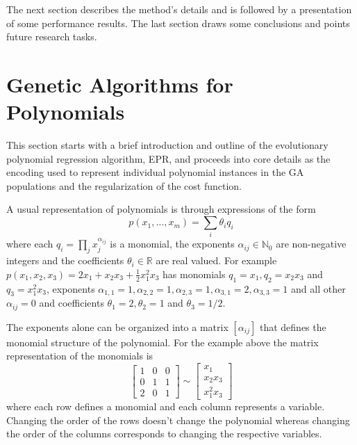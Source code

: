 \documentclass[review,preprint]{elsarticle}
\begin{document}
The next section describes the method's details and is followed by a presentation of some performance results. The last section draws some conclusions and points future research tasks.

\section{Genetic Algorithms for Polynomials}
This section starts with a brief introduction and outline of the evolutionary polynomial regression algorithm, \ac{EPR}, and proceeds into core details as the encoding used to represent individual polynomial instances in the \ac{GA} populations and the regularization of the cost function.

A usual representation of polynomials is through expressions of the form
$$
p\left( x_1, \ldots, x_m\right) = \sum_i \theta_i q_i
$$
where each $q_i = \prod_{j} x_j^{\alpha_{ij}}$ is a monomial, the exponents $\alpha_{ij}\in\mathbb{N}_0$ are non-negative integers and the coefficients $\theta_i \in \mathbb{R}$ are real valued. For example $p\left( x_1, x_2, x_3 \right) = 2 x_1 + x_2 x_3 + \frac{1}{2} x_1^2 x_3$ has monomials $q_1 = x_1, q_2 = x_2 x_3$ and $q_3 = x_1^2 x_3$, exponents $\alpha_{1,1} = 1, \alpha_{2,2}=1, \alpha_{2,3} = 1, \alpha_{3,1} = 2, \alpha_{3,3} = 1$ and all other $\alpha_{ij} = 0$ and coefficients $\theta_1 = 2, \theta_2 = 1$ and $\theta_3 = 1/2$.

The exponents alone can be organized into a matrix $\left[\alpha_{ij}\right]$ that defines the monomial structure of the polynomial. For the example above the matrix representation of the monomials is
$$
\left[ 
\begin{array}{ccc}
1 & 0 & 0 \\
0 & 1 & 1 \\
2 & 0 & 1
\end{array}
\right] \sim 
\left[ 
\begin{array}{ccc}
x_1 \\
x_2 x_3 \\
x_1^2 x_3
\end{array}
\right]
$$
where each row defines a monomial and each column represents a variable. Changing the order of the rows doesn't change the polynomial whereas changing the order of the columns corresponds to changing the respective variables.
\end{document}
